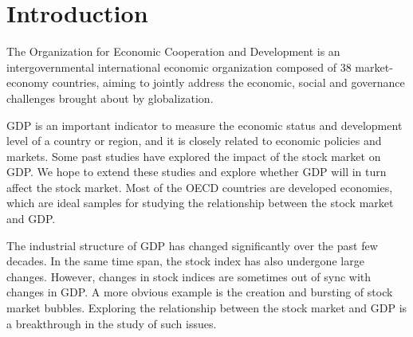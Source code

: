 \documentclass[../main.tex]{subfiles}
\begin{document}
\section{Introduction}

The Organization for Economic Cooperation and Development is an intergovernmental international economic organization composed of 38 market-economy countries, aiming to jointly address the economic, social and governance challenges brought about by globalization.

GDP is an important indicator to measure the economic status and development level of a country or region, and it is closely related to economic policies and markets. Some past studies have explored the impact of the stock market on GDP. We hope to extend these studies and explore whether GDP will in turn affect the stock market. Most of the OECD countries are developed economies, which are ideal samples for studying the relationship between the stock market and GDP.

The industrial structure of GDP has changed significantly over the past few decades. In the same time span, the stock index has also undergone large changes. However, changes in stock indices are sometimes out of sync with changes in GDP. A more obvious example is the creation and bursting of stock market bubbles. Exploring the relationship between the stock market and GDP is a breakthrough in the study of such issues.
\end{document}
